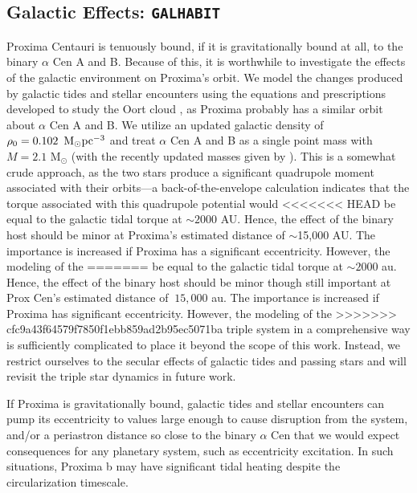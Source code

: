 \documentclass[preprint,12pt]{aastex}
\def\msun{{\rm\,M_\odot}}
\def\eg{{\it e.g.\ }}
\def\galhabit{\texttt{\footnotesize{GALHABIT}}\xspace}
\begin{document}
\subsection{Galactic Effects: \galhabit}
\label{sec:models:galhabit}
Proxima Centauri is tenuously bound, if it is gravitationally bound at all, to 
the binary $\alpha$ Cen A and B. Because of this, it is worthwhile
to investigate the effects of the galactic environment on 
Proxima's orbit. We model the changes produced by galactic tides 
and stellar encounters using the equations and prescriptions 
developed to study the Oort cloud \citep{Heisler1986, Heisler1987, Rickman2008}, as Proxima probably has a similar orbit about $\alpha$ Cen A and B. We utilize an updated galactic 
density of $\rho_0 = 0.102~\msun \rm{pc}^{-3}$ \citep{Holmberg2000} and treat 
$\alpha$ Cen A and B as a single point mass with $M = 2.1$ 
M$_{\odot}$ (with the recently updated masses given by 
\cite{PourbaixBoffin16}). This is a somewhat crude approach, as 
the two stars produce a significant quadrupole moment associated 
with their orbits---a back-of-the-envelope calculation indicates
that the torque associated with this quadrupole potential would 
<<<<<<< HEAD
be equal to the galactic tidal torque at $\sim 2000$ AU. Hence, 
the effect of the binary host should be minor 
at Proxima's estimated distance of $\sim$15,000 AU. The importance is increased if Proxima has a significant eccentricity. However, the modeling of the 
=======
be equal to the galactic tidal torque at $\sim 2000$ au. Hence, 
the effect of the binary host should be minor though still important 
at Prox Cen's estimated distance of $~15,000$ au. The importance is increased if Proxima
has significant eccentricity. However, the modeling of the 
>>>>>>> cfc9a43f64579f7850f1ebb859ad2b95ec5071ba
triple system in a comprehensive way is sufficiently complicated
\citep[see, \eg][]{Harrington1968, Ford2000} to place it beyond 
the scope of this work. Instead, we restrict ourselves to the 
secular effects of galactic tides and passing stars 
and will revisit the triple star dynamics in future work. 

If Proxima is gravitationally bound, galactic tides and stellar 
encounters can pump its eccentricity to values large enough to 
cause disruption from the system, and/or a periastron distance 
so close to the binary $\alpha$ Cen that we would expect 
consequences for any planetary system, such as eccentricity 
excitation. In such situations, Proxima b may have significant tidal 
heating despite the circularization timescale. 
\end{document}

